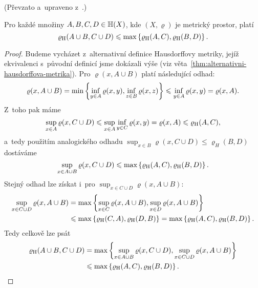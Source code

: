 (Převzato a~upraveno z~\citep[str. 79]{Barnsley1993}.)
\begin{lemma}\label{lem:hausdorffova-metrika-odhad-sjednoceni}
    Pro každé množiny $A,B,C,D\in\mathbb{H}(X)$, kde $(X,\varrho)$ je metrický prostor, platí
    \[\varrho_\textup{H}(A\cup B,C\cup D)\leqslant\max\left\{\varrho_\textup{H}(A,C),\varrho_\textup{H}(B,D)\right\}.\]
\end{lemma}
\begin{proof}
    Budeme vycházet z~alternativní definice Hausdorffovy metriky, jejíž ekvivalenci s~původní definicí jsme dokázali výše (viz věta~\ref{thm:alternativni-hausdorffova-metrika}). Pro $\varrho(x,A\cup B)$ platí následující odhad:
    \[\varrho(x,A\cup B)=\min\left\{\inf_{y\in A}\varrho(x,y),\inf_{z\in B}\varrho(x,z)\right\}\leqslant\inf_{y\in A}\varrho(x,y)=\varrho(x,A).\]
    Z~toho pak máme
    \[\sup_{x\in A}\varrho(x,C\cup D)\leqslant\sup_{x\in A}\inf_{y\in C}\varrho(x,y)=\varrho(x,A)\leqslant\varrho_\textup{H}(A,C),\]
    a~tedy použitím analogického odhadu $\sup_{x\in B}\varrho(x,C\cup D)\leq \varrho_H(B,D)$ dostáváme
    \[\sup_{x\in A\cup B}\varrho(x,C\cup D)\leqslant\max\left\{\varrho_\textup{H}(A,C),\varrho_\textup{H}(B,D)\right\}.\]
    Stejný odhad lze získat i~pro $\sup_{x\in C\cup D}\varrho(x,A\cup B)$:
    \begin{align*}
        \sup_{x\in C\cup D}\varrho(x,A\cup B)&=\max\left\{\sup_{x\in C}\varrho(x,A\cup B),\sup_{x\in D}\varrho(x,A\cup B)\right\}\\
        &\leqslant\max\left\{\varrho_\textup{H}(C,A),\varrho_\textup{H}(D,B)\right\}=\max\left\{\varrho_\textup{H}(A,C),\varrho_\textup{H}(B,D)\right\}.
    \end{align*}
    Tedy celkově lze psát
    \begin{align*}
        \varrho_\textup{H}(A\cup B,C\cup D)&=\max\left\{\sup_{x\in A\cup B}\varrho(x,C\cup D),\sup_{x\in C\cup D}\varrho(x,A\cup B)\right\}\\
        &\leqslant\max\left\{\varrho_\textup{H}(A,C),\varrho_\textup{H}(B,D)\right\}.
    \end{align*}
\end{proof}

